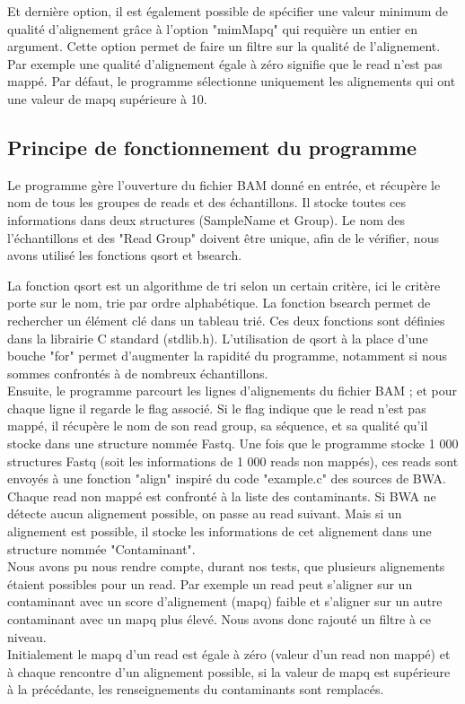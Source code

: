\documentclass[a4paper,12pt]{article}
\begin{document}
Et dernière option, il est également possible de spécifier une valeur minimum de qualité d'alignement grâce à l'option "mimMapq" qui requière un entier en argument. Cette option permet de faire un filtre sur la qualité de l'alignement. Par exemple une qualité d'alignement égale à zéro signifie que le read n'est pas mappé. Par défaut, le programme sélectionne uniquement les alignements qui ont une valeur de mapq supérieure à 10. 


\subsection{Principe de fonctionnement du programme}


Le programme gère l'ouverture du fichier BAM donné en entrée, et récupère le nom de tous les groupes de reads et des échantillons. Il stocke toutes ces informations dans deux structures (SampleName et Group). Le nom des l'échantillons et des "Read Group" doivent être unique, afin de le vérifier, nous avons utilisé les fonctions qsort et bsearch. 

La fonction qsort est un algorithme de tri selon un certain critère, ici le critère porte sur le nom, trie par ordre alphabétique. La fonction bsearch permet de rechercher un élément clé dans un tableau trié. Ces deux fonctions sont définies dans la librairie C standard (stdlib.h). L'utilisation de qsort à la place d'une bouche "for" permet d'augmenter la rapidité du programme, notamment si nous sommes confrontés à de nombreux échantillons.\\


Ensuite, le programme parcourt les lignes d'alignements du fichier BAM ; et pour chaque ligne il regarde le flag associé. Si le flag indique que le read n'est pas mappé, il récupère le nom de son read group, sa séquence, et sa qualité qu'il stocke dans une structure nommée Fastq. Une fois que le programme stocke 1 000 structures Fastq (soit les informations de 1 000 reads non mappés), ces reads sont envoyés à une fonction "align" inspiré du code "example.c" des sources de BWA. \\
Chaque read non mappé est confronté à la liste des contaminants. Si BWA ne détecte aucun alignement possible, on passe au read suivant. Mais si un alignement est possible, il stocke les informations de cet alignement dans une structure nommée "Contaminant". \\ 

Nous avons pu nous rendre compte, durant nos tests, que plusieurs alignements étaient possibles pour un read. Par exemple un read peut s'aligner sur un contaminant avec un score d'alignement (mapq) faible et s'aligner sur un autre contaminant avec un mapq plus élevé. Nous avons donc rajouté un filtre à ce niveau. \\
Initialement le mapq d'un read est égale à zéro (valeur d'un read non mappé) et à chaque rencontre d'un alignement possible, si la valeur de mapq est supérieure à la précédante, les renseignements du contaminants sont remplacés. \\
\end{document}
